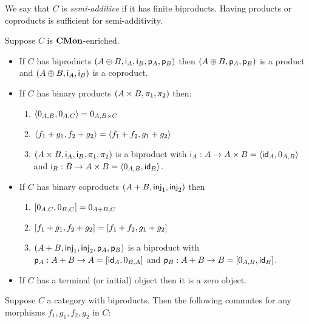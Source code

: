 \noindent We say that $C$ is \emph{semi-additive} if it has finite biproducts. Having products or coproducts
is sufficient for semi-additivity.

\begin{proposition}
\label{prop:biproduct:from-product-or-coproduct}
Suppose $C$ is $\mathbf{CMon}$-enriched.
\begin{itemize}
\item If $C$ has biproducts $(A \oplus B, \mathsf{i}_A, \mathsf{i}_B, \mathsf{p}_A, \mathsf{p}_B)$ then $(A
\oplus B, \mathsf{p}_A, \mathsf{p}_B)$ is a product and $(A \oplus B, \mathsf{i}_A, \mathsf{i}_B)$ is a coproduct.
\item If $C$ has binary products $(A \times B, \pi_1, \pi_2)$ then:
\begin{enumerate}
\item $\langle 0_{A,B}, 0_{A,C}\rangle = 0_{A,B \times C}$
\item $\langle f_1 + g_1, f_2 + g_2\rangle = \langle f_1 + f_2, g_1 + g_2\rangle$
\item $(A \times B, \mathsf{i}_A, \mathsf{i}_B, \pi_1, \pi_2)$ is a
biproduct with $\mathsf{i}_A: A \to A \times B = \langle \mathsf{id}_A, 0_{A,B}\rangle$ and $\mathsf{i}_B: B \to A \times B =
\langle 0_{A,B}, \mathsf{id}_B\rangle$.
\end{enumerate}
\item If $C$ has binary coproducts $(A + B, \mathsf{inj}_1, \mathsf{inj}_2)$ then
\begin{enumerate}
\item $[0_{A,C}, 0_{B,C}] = 0_{A + B,C}$
\item $[f_1 + g_1, f_2 + g_2] = [f_1 + f_2, g_1 + g_2]$
\item $(A + B, \mathsf{inj}_1, \mathsf{inj}_2, \mathsf{p}_A, \mathsf{p}_B)$ is a
biproduct with $\mathsf{p}_A: A + B \to A = [\mathsf{id}_A, 0_{B,A}]$ and $\mathsf{p}_B: A + B \to B =
[0_{A,B}, \mathsf{id}_B]$.
\end{enumerate}
\item If $C$ has a terminal (or initial) object then it is a zero object.
\end{itemize}
\end{proposition}

\begin{proposition}
\label{prop:biproduct:prod-coprod}
Suppose $C$ a category with biproducts. Then the following commutes for any morphisms $f_1, g_1, f_2,
g_2$ in $C$:

\begin{center}
\end{center}
\end{proposition}
